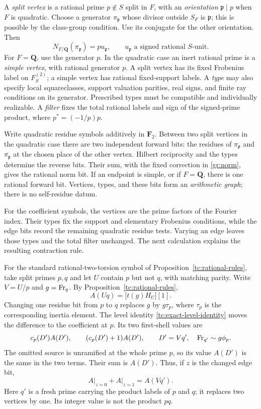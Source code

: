A \emph{split vertex} is a rational prime $p\notin S$ split in $F$,
with an \emph{orientation} $\mathfrak p\mid p$ when $F$ is quadratic.
Choose a generator $\pi_{\mathfrak p}$ whose divisor outside $S_F$ is
$\mathfrak p$; this is possible by the class-group condition.  Use its
conjugate for the other orientation.  Then
\begin{equation}\label{gr:norm}
 N_{F/\mathbf Q}(\pi_{\mathfrak p})=p u_{\mathfrak p},
 \qquad u_{\mathfrak p}\text{ a signed rational }S\text{-unit}.
\end{equation}
For $F=\mathbf Q$, use the generator $p$.  In the quadratic case an inert
rational prime is a \emph{simple vertex}, with rational generator $p$.
A split vertex has its fixed Frobenius label on $F_S^{(2)}$; a simple
vertex has rational fixed-support labels.  A \emph{type} may also specify
local squareclasses, support valuation parities, real signs, and finite ray
conditions on its generator.  Prescribed types must be compatible and
individually realizable.  A \emph{filter} fixes the total rational labels
and sign of the signed-prime product, where $p^*=(-1/p)p$.

Write quadratic residue symbols additively in $\mathbf F_2$.  Between two
split vertices in the quadratic case there are two independent forward
bits: the residues of $\pi_{\mathfrak p}$ and
$\overline{\pi_{\mathfrak p}}$ at the chosen place of the other vertex.
Hilbert reciprocity and the types determine the reverse bits.
Their sum, with the fixed correction in \eqref{gr:norm}, gives the rational
norm bit.  If an endpoint is simple, or if $F=\mathbf Q$, there is one
rational forward bit.  Vertices, types, and these bits form an
\emph{arithmetic graph}; there is no self-residue datum.

For the coefficient symbols, the vertices are the prime factors of the
Fourier index. Their types fix the support and elementary Frobenius
conditions, while the edge bits record the remaining quadratic residue
tests. Varying an edge leaves those types and the total filter unchanged.
The next calculation explains the resulting contraction rule.

For the standard rational-two-torsion symbol of
Proposition~\ref{tc:rational-rules}, take split primes $p,q$ and let $U$
contain $p$ but not $q$, with matching
parity. Write $V=U/p$ and $g=\operatorname{Fr}_q$. By
Proposition~\ref{tc:rational-rules},
\[
 A(Uq)=\bigl[t(g)H_U\bigr][1].
\]
Changing one residue bit from $p$ to $q$ replaces $g$ by $g\tau_p$,
where $\tau_p$ is the corresponding inertia element. The level identity
\eqref{tc:exact-level-identity} moves the difference to the coefficient
at $p$. Its two first-shell values are
\[
 c_p(D')A(D'),\qquad (c_p(D')+1)A(D'),
 \qquad D'=Vq',\quad \operatorname{Fr}_{q'}\sim g\phi_p.
\]
The omitted source is unramified at the whole prime $p$, so its value
$A(D')$ is the same in the two terms. Their sum is $A(D')$.
Thus, if $z$ is the changed edge bit,
\begin{equation}\label{gr:first-contraction}
 A\big|_{z=0}+A\big|_{z=1}=A(Vq').
\end{equation}
Here $q'$ is a fresh prime carrying the product labels of $p$ and $q$;
it replaces two vertices by one. Its integer value is not the product
$pq$.

